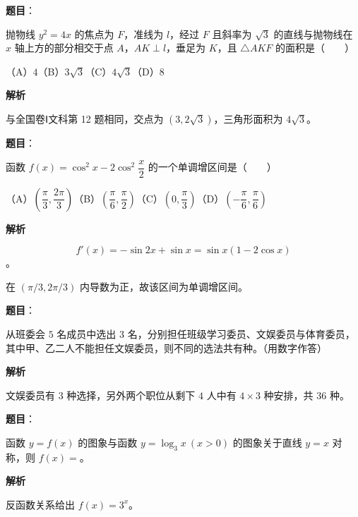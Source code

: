 \begin{answer}

\textbf{题目}：

抛物线 $y^2=4x$ 的焦点为 $F$，准线为 $l$，经过 $F$ 且斜率为 $\sqrt3$ 的直线与抛物线在 $x$ 轴上方的部分相交于点 $A$，$AK\perp l$，垂足为 $K$，且 $\triangle AKF$ 的面积是\mbox{（　　）}

（A）$4$\quad（B）$3\sqrt3$\quad（C）$4\sqrt3$\quad（D）$8$

\textbf{解析}

与全国卷Ⅰ文科第 12 题相同，交点为 $(3,2\sqrt3)$，三角形面积为 $4\sqrt3$。


\end{answer}
\begin{answer}

\textbf{题目}：

函数 $f(x)=\cos^2x-2\cos^2\dfrac x2$ 的一个单调增区间是\mbox{（　　）}

（A）$\left(\dfrac\pi3,\dfrac{2\pi}3\right)$\quad（B）$\left(\dfrac\pi6,\dfrac\pi2\right)$\quad（C）$\left(0,\dfrac\pi3\right)$\quad（D）$\left(-\dfrac\pi6,\dfrac\pi6\right)$

\textbf{解析}

\nopagebreak[4]
\[
f'(x)=-\sin2x+\sin x=\sin x(1-2\cos x)
\]
。

在 $(\pi/3,2\pi/3)$ 内导数为正，故该区间为单调增区间。


\end{answer}
\begin{answer}

\textbf{题目}：

从班委会 $5$ 名成员中选出 $3$ 名，分别担任班级学习委员、文娱委员与体育委员，其中甲、乙二人不能担任文娱委员，则不同的选法共有\gkblank{}种。（用数字作答）

\textbf{解析}

文娱委员有 $3$ 种选择，另外两个职位从剩下 $4$ 人中有 $4\times3$ 种安排，共 $36$ 种。


\end{answer}
\begin{answer}

\textbf{题目}：

函数 $y=f(x)$ 的图象与函数 $y=\log_3x\ (x>0)$ 的图象关于直线 $y=x$ 对称，则 $f(x)=$\gkblank{}。

\textbf{解析}

反函数关系给出 $f(x)=3^x$。


\end{answer}

